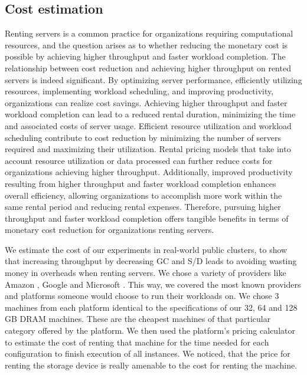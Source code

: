 \subsection{Cost estimation}
Renting servers is a common practice for organizations requiring
computational resources, and the question arises as to whether
reducing the monetary cost is possible by achieving higher throughput
and faster workload completion. The relationship between cost
reduction and achieving higher throughput on rented servers is indeed
significant. By optimizing server performance, efficiently utilizing
resources, implementing workload scheduling, and improving
productivity, organizations can realize cost savings. Achieving higher
throughput and faster workload completion can lead to a reduced rental
duration, minimizing the time and associated costs of server usage.
Efficient resource utilization and workload scheduling contribute to
cost reduction by minimizing the number of servers required and
maximizing their utilization. Rental pricing models that take into
account resource utilization or data processed can further reduce
costs for organizations achieving higher throughput. Additionally,
improved productivity resulting from higher throughput and faster
workload completion enhances overall efficiency, allowing
organizations to accomplish more work within the same rental period
and reducing rental expenses. Therefore, pursuing higher throughput
and faster workload completion offers tangible benefits in terms of
monetary cost reduction for organizations renting servers. 

We estimate the cost of our experiments in real-world public clusters, to show that increasing throughput by
decreasing GC and S/D leads to avoiding wasting money in overheads when renting servers. We
chose a variety of providers like Amazon \cite{EC2}, Google \cite{GCP} and Microsoft \cite{Azure}. This
way, we covered the most known providers and platforms someone would
choose to run their workloads on. We chose 3 machines from each
platform identical to the specifications of our 32, 64 and 128 GB DRAM
machines. These are the cheapest machines of that particular category
offered by the platform. We then used the platform's pricing
calculator to estimate the cost of renting that machine for the time
needed for each configuration to finish execution of all instances. We noticed, that the price for
renting the storage device is really amenable to the cost for renting the machine.
%
